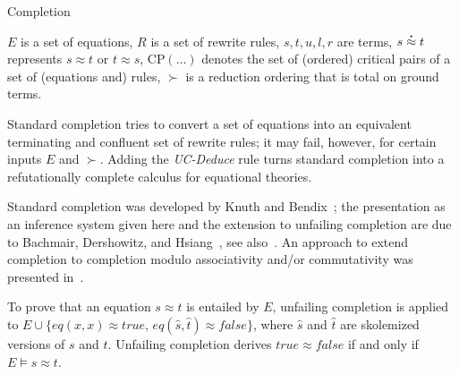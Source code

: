 \begin{entry}{Completion}
\begin{calculus}
$E$ is a set of equations,
$R$ is a set of rewrite rules,
$s,t,u,l,r$ are terms,
$s \deq t$ represents $s \approx t$ or $t \approx s$,
$\mathrm{CP}(\dots)$ denotes the set of (ordered) critical
pairs of a set of (equations and) rules,
$\succ$ is a reduction ordering that is total on ground terms.

\end{calculus}



\begin{clarifications}
Standard completion tries to convert a set of equations into
an equivalent terminating and confluent set of rewrite rules;
it may fail, however, for certain inputs $E$ and $\succ$.
Adding the \textit{UC-Deduce} rule turns standard completion into
a refutationally complete calculus for equational theories.
\end{clarifications}

\begin{history}
Standard completion was developed by Knuth and Bendix~\cite{KnuthBendix1970};
the presentation as an inference system given here
and the extension to unfailing completion
are due to
Bachmair, Dershowitz, and Hsiang~\cite{BachmairDershowitzHsiang1986LICS},
see also~\cite{Bachmair1991}.
An approach to extend completion to completion modulo
associativity and/or commutativity was presented in~\cite{PetersonStickel1981}.

\end{history}

\begin{technicalities}
To prove that an equation $s \approx t$ is entailed by $E$,
unfailing completion is
applied to $E \cup \{\mathit{eq}(x,x) \approx \mathit{true}$,
$\mathit{eq}(\hat{s},\hat{t}) \approx \mathit{false}\}$,
where $\hat{s}$ and $\hat{t}$ are skolemized versions of $s$ and $t$.
Unfailing completion derives $\mathit{true} \approx \mathit{false}$
if and only if $E \models s \approx t$.
\end{technicalities}













\end{entry}
